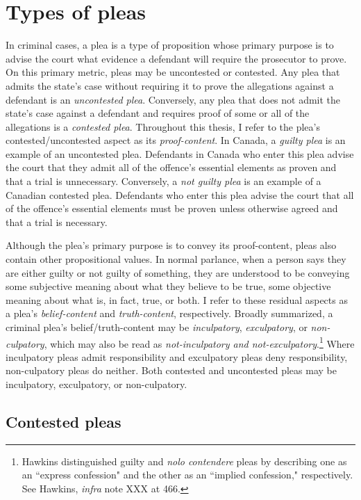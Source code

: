 \section{Types of pleas}

In criminal cases, a plea is a type of proposition whose primary purpose is to advise the court what evidence a defendant will require the prosecutor to prove. On this primary metric, pleas may be uncontested or contested. Any plea that admits the state's case without requiring it to prove the allegations against a defendant is an \textit{uncontested plea}. Conversely, any plea that does not admit the state's case against a defendant and requires proof of some or all of the allegations is a \textit{contested plea}. Throughout this thesis, I refer to the plea's contested/uncontested aspect as its \textit{proof-content}. In Canada, a \textit{guilty plea} is an example of an uncontested plea. Defendants in Canada who enter this plea advise the court that they admit all of the offence's essential elements as proven and that a trial is unnecessary. Conversely, a \textit{not guilty plea} is an example of a Canadian contested plea. Defendants who enter this plea advise the court that all of the offence's essential elements must be proven unless otherwise agreed and that a trial is necessary.

Although the plea's primary purpose is to convey its proof-content, pleas also contain other propositional values. In normal parlance, when a person says they are either guilty or not guilty of something, they are understood to be conveying some subjective meaning about what they believe to be true, some objective meaning about what is, in fact, true, or both. I refer to these residual aspects as a plea's \textit{belief-content} and \textit{truth-content}, respectively. Broadly summarized, a criminal plea's belief/truth-content may be \textit{inculpatory}, \textit{exculpatory}, or \textit{non-culpatory}, which may also be read as \textit{not-inculpatory and not-exculpatory}.\footnote{Hawkins distinguished guilty and \textit{nolo contendere} pleas by describing one as an ``express confession" and the other as an ``implied confession," respectively. See Hawkins, \textit{infra} note XXX at 466.} Where inculpatory pleas admit responsibility and exculpatory pleas deny responsibility, non-culpatory pleas do neither. Both contested and uncontested pleas may be inculpatory, exculpatory, or non-culpatory.

\subsection{Contested pleas}

